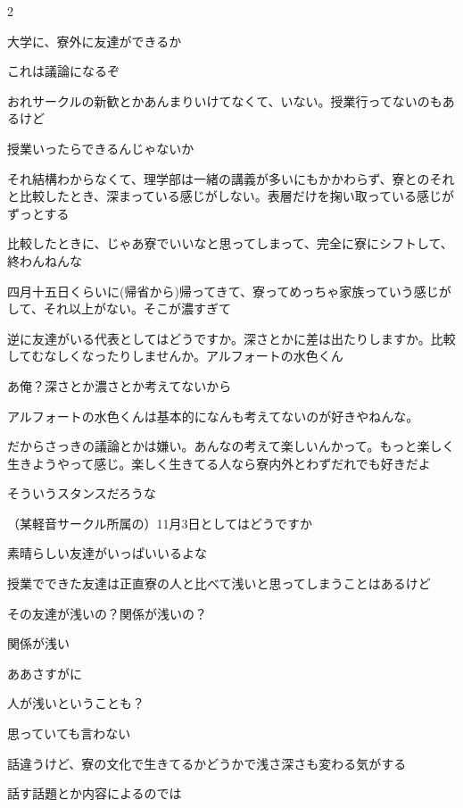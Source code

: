 \begin{multicols}{2}

 大学に、寮外に友達ができるか

 これは議論になるぞ

 おれサークルの新歓とかあんまりいけてなくて、いない。授業行ってないのもあるけど

 授業いったらできるんじゃないか

 それ結構わからなくて、理学部は一緒の講義が多いにもかかわらず、寮とのそれと比較したとき、深まっている感じがしない。表層だけを掬い取っている感じがずっとする

 比較したときに、じゃあ寮でいいなと思ってしまって、完全に寮にシフトして、終わんねんな

 四月十五日くらいに(帰省から)帰ってきて、寮ってめっちゃ家族っていう感じがして、それ以上がない。そこが濃すぎて

 逆に友達がいる代表としてはどうですか。深さとかに差は出たりしますか。比較してむなしくなったりしませんか。アルフォートの水色くん

 あ俺？深さとか濃さとか考えてないから

 アルフォートの水色くんは基本的になんも考えてないのが好きやねんな。

 だからさっきの議論とかは嫌い。あんなの考えて楽しいんかって。もっと楽しく生きようやって感じ。楽しく生きてる人なら寮内外とわずだれでも好きだよ

 そういうスタンスだろうな

 （某軽音サークル所属の）11月3日としてはどうですか

 素晴らしい友達がいっぱいいるよな

 授業でできた友達は正直寮の人と比べて浅いと思ってしまうことはあるけど

 その友達が浅いの？関係が浅いの？

 関係が浅い

 ああさすがに

 人が浅いということも？

 思っていても言わない

 話違うけど、寮の文化で生きてるかどうかで浅さ深さも変わる気がする

 話す話題とか内容によるのでは


\end{multicols}
